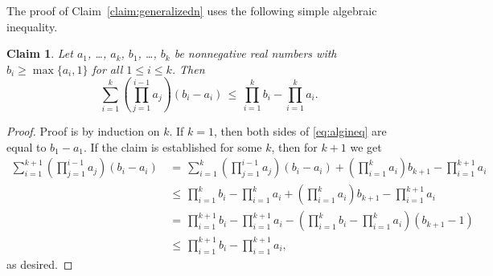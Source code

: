 \documentclass[10pt]{article}
\numberwithin{equation}{subsection}
\newtheorem{claim}[theo]{Claim}
\theoremstyle{definition}
\begin{document}
	The proof of Claim~\ref{claim:generalizedn} uses the following simple algebraic inequality.
	
	\begin{claim}\label{claim:algineq}
		Let $a_1$, \ldots, $a_k$, $b_1$, \ldots, $b_k$ be nonnegative real numbers with $b_i \geq \max\{a_i,1\}$ for all $1 \leq i \leq k$. Then
		\begin{equation}\label{eq:algineq}
		\sum_{i = 1}^k \left(\prod_{j=1}^{i-1}a_j\right) (b_i - a_i) \,\leq\, \prod_{i=1}^k b_i - \prod_{i=1}^k a_i.
		\end{equation}		
	\end{claim}
	\begin{proof}
		Proof is by induction on $k$. If $k = 1$, then both sides of \eqref{eq:algineq} are equal to $b_1 -a_1$. If the claim is established for some $k$, then for $k+1$ we get
		\begin{align*}
		\sum_{i = 1}^{k+1} \left(\prod_{j=1}^{i-1}a_j\right) (b_i - a_i) \,&=\, \sum_{i = 1}^k \left(\prod_{j=1}^{i-1}a_j\right) (b_i - a_i) + \left(\prod_{i=1}^k a_i\right)b_{k+1} - \prod_{i=1}^{k+1} a_i\\
		&\leq\, \prod_{i=1}^k b_i -\prod_{i=1}^k a_i + \left(\prod_{i=1}^k a_i\right)b_{k+1} - \prod_{i=1}^{k+1} a_i \\
		&=\,\prod_{i=1}^{k+1}b_i - \prod_{i=1}^{k+1}a_i -\left(\prod_{i=1}^k b_i - \prod_{i=1}^k a_i\right)(b_{k+1}-1)\\
		&\leq\, \prod_{i=1}^{k+1}b_i - \prod_{i=1}^{k+1}a_i,
		\end{align*}
		as desired.
	\end{proof}
	
\end{document}
